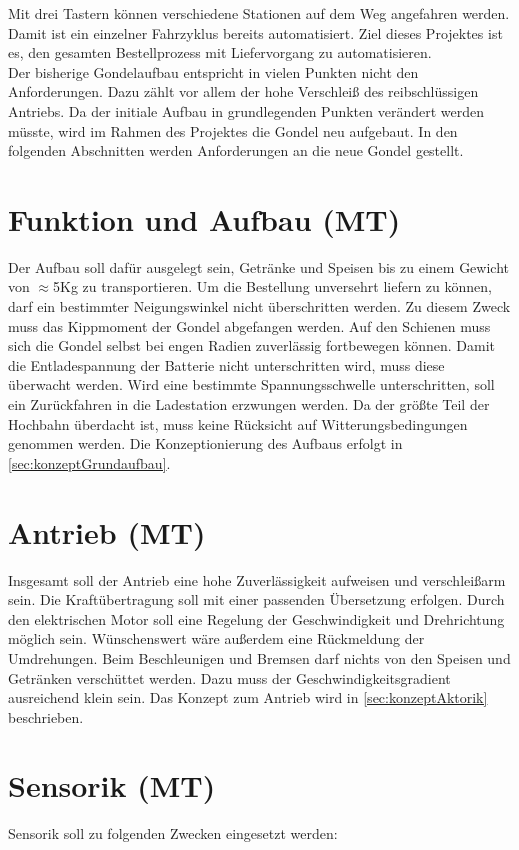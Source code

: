 Mit drei Tastern können verschiedene Stationen auf dem Weg angefahren werden. Damit ist ein einzelner Fahrzyklus bereits automatisiert. Ziel dieses Projektes ist es, den gesamten Bestellprozess mit Liefervorgang zu automatisieren. \\

Der bisherige Gondelaufbau entspricht in vielen Punkten nicht den Anforderungen. Dazu zählt vor allem der hohe Verschleiß des reibschlüssigen Antriebs. Da der initiale Aufbau in grundlegenden Punkten verändert werden müsste, wird im Rahmen des Projektes die Gondel neu aufgebaut. In den folgenden Abschnitten werden Anforderungen an die neue Gondel gestellt. 

\section{Funktion und Aufbau (MT)}
\label{sec:anforderungFunktionUndAufbau}
Der Aufbau soll dafür ausgelegt sein, Getränke und Speisen bis zu einem Gewicht von $\approx$5Kg zu transportieren. Um die Bestellung unversehrt liefern zu können, darf ein bestimmter Neigungswinkel nicht überschritten werden. Zu diesem Zweck muss das Kippmoment der Gondel abgefangen werden. Auf den Schienen muss sich die Gondel selbst bei engen Radien zuverlässig fortbewegen können. Damit die Entladespannung der Batterie nicht unterschritten wird, muss diese überwacht werden. Wird eine bestimmte Spannungsschwelle unterschritten, soll ein Zurückfahren in die Ladestation erzwungen werden. Da der größte Teil der Hochbahn überdacht ist, muss keine Rücksicht auf Witterungsbedingungen genommen werden. Die Konzeptionierung des Aufbaus erfolgt in \autoref{sec:konzeptGrundaufbau}.
\newpage


\section{Antrieb (MT)}
\label{sec:anforderungAntrieb}
Insgesamt soll der Antrieb eine hohe Zuverlässigkeit aufweisen und verschleißarm sein. 
Die Kraftübertragung soll mit einer passenden Übersetzung erfolgen. Durch den elektrischen Motor soll eine Regelung der Geschwindigkeit und Drehrichtung möglich sein. Wünschenswert wäre außerdem eine Rückmeldung der Umdrehungen. Beim Beschleunigen und Bremsen darf nichts von den Speisen und Getränken verschüttet werden. Dazu muss der Geschwindigkeitsgradient ausreichend klein sein. Das Konzept zum Antrieb wird in \autoref{sec:konzeptAktorik} beschrieben. 


\section{Sensorik (MT)}
\label{sec:anforderungSensorik}
Sensorik soll zu folgenden Zwecken eingesetzt werden: 

